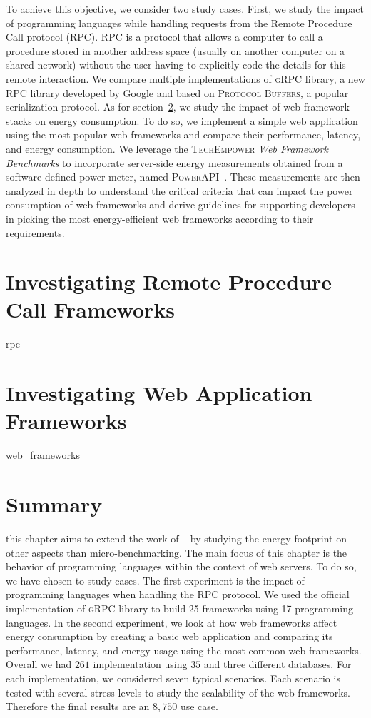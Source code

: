 To achieve this objective, we consider two study cases.
First, we study the impact of programming languages while handling requests from the Remote Procedure Call protocol (RPC).
RPC is a protocol that allows a computer to call a procedure stored in another address space (usually on another computer on a shared network) without the user having to explicitly code the details for this remote interaction.
We compare multiple implementations of \textsc{gRPC} library, a new RPC library developed by Google and based on \textsc{Protocol Buffers}, a popular serialization protocol.
As for section~\ref{sec:webframework}, we study the impact of web framework stacks on energy consumption. To do so, we implement a simple web application using the most popular web frameworks and compare their performance, latency, and energy consumption.  We leverage the \textsc{TechEmpower} \emph{Web Framework Benchmarks} to incorporate server-side energy measurements obtained from a software-defined power meter, named \textsc{PowerAPI}~\cite{fieni2020smartwatts}.
These measurements are then analyzed in depth to understand the critical criteria that can impact the power consumption of web frameworks and derive guidelines for supporting developers in picking the most energy-efficient web frameworks according to their requirements.


\section{Investigating Remote Procedure Call Frameworks}
{rpc}

\section{Investigating Web Application Frameworks}\label{sec:webframework}

{web_frameworks}

\section{Summary}

this chapter aims to extend the work of \citeauthor{pereira_energy_2017}~\cite{pereira_energy_2017} by studying the energy footprint on other aspects than micro-benchmarking.
The main focus of this chapter is the behavior of programming languages within the context of web servers. To do so, we have chosen to study cases.
The first experiment is the impact of programming languages when handling the RPC protocol. We used the official implementation of \textsc{gRPC} library to build 25 frameworks using 17 programming languages.
In the second experiment, we look at how web frameworks affect energy consumption by creating a basic web application and comparing its performance, latency, and energy usage using the most common web frameworks.
Overall we had $261$ implementation using $35$ and three different databases.
For each implementation, we considered seven typical scenarios. Each scenario is tested with several stress levels to study the scalability of the web frameworks. Therefore the final results are an $8,750$ use case.

